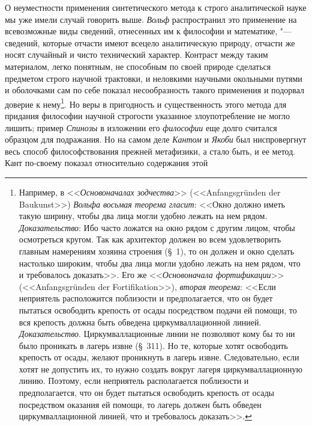 О неуместности применения синтетического метода к строго
аналитической науке мы уже имели случай говорить выше.
{\em Вольф} распространил
это применение на всевозможные виды сведений, отнесенных им к философии и
математике, "--- сведений, которые отчасти имеют всецело
аналитическую природу, отчасти же носят случайный и чисто технический
характер. Контраст между таким материалом, легко понятным, не способным по
своей природе сделаться предметом строго научной трактовки, и неловкими
научными окольными путями и оболочками сам по себе показал
несообразность такого применения и подорвал доверие к
нему\footnote{Например, в <<{\em Основоначалах зодчества}>>
(<<Anfangsgründen der Baukunst>>) {\em Вольфа восьмая теорема гласит}:
<<Окно должно иметь такую ширину, чтобы два лица
могли удобно лежать на нем рядом. {\em Доказательство}:
Ибо часто ложатся на окно рядом с другим лицом, чтобы
осмотреться кругом. Так как архитектор должен во всем удовлетворить главным
намерениям хозяина строения (\S~1), то он должен и окно сделать настолько
широким, чтобы два лица могли удобно лежать на нем рядом, что и требовалось
доказать>>. Его же <<{\em Основоначала фортификации}>>
(<<Anfangsgründen der Fortifikation>>), {\em вторая теорема}:
<<Если неприятель расположится поблизости и предполагается,
что он будет пытаться освободить крепость от осады посредством подачи ей
помощи, то вся крепость должна быть обведена циркумваллационной
линией. {\em Доказательство}.
Циркумваллационные линии не позволяют кому бы то ни было
проникать в лагерь извне (\S~311). Но те, которые хотят освободить крепость
от осады, желают проникнуть в лагерь извне. Следовательно, если хотят не
допустить их, то нужно создать вокруг лагеря циркумваллационную линию.
Поэтому, если неприятель располагается поблизости и предполагается, что он
будет пытаться освободить крепость от осады посредством оказания ей помощи,
то лагерь должен быть обведен циркумваллационной линией, что и требовалось
доказать>>.}. Но веры в пригодность и существенность этого
метода для придания философии научной строгости указанное злоупотребление
не могло лишить; пример {\em Спинозы}
в изложении его
{\em философии} еще долго
считался образцом для подражания. Но на самом деле
{\em Кантом} и
{\em Якоби} был
ниспровергнут весь способ философствования прежней метафизики, а стало
быть, и ее метод. Кант по-своему показал относительно содержания этой
